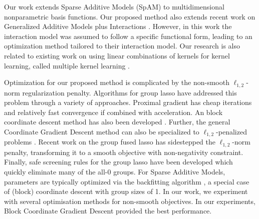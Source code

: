 Our work extends Sparse Additive Models (SpAM) \citep{ravikumar09spam} 
to multidimensional nonparametric basis functions.
Our proposed method also extends recent work on 
Generalized Additive Models plus Interactions \citep{intelligible:2013}.
However, in this work the interaction model was assumed to follow a specific functional form,
leading to an optimization method tailored to their interaction model.
Our research is also related to existing work on 
using linear combinations of kernels for kernel learning,
called multiple kernel learning \citep{mkl-review:2011}.

Optimization for our proposed method is complicated by 
the non-smooth $\ell_{1,2}$-norm regularization penalty.
Algorithms for group lasso have addressed this problem 
through a variety of approaches.
Proximal gradient \citep{beck2009fast}
has cheap iterations and relatively fast convergence if combined with acceleration.
An block coordinate descent method has also been developed \citep{bcd-group-lasso:2013}.
Further, the general Coordinate Gradient Descent method \citep{cgd:2009} 
can also be specialized to $\ell_{1,2}$-penalized problems 
\citep{meier2008group,note-group-lasso:2010}.
Recent work \citep{group-fused-lasso:2014} on the group fused lasso 
has sidestepped the $\ell_{1,2}$-norm penalty, transforming it to a 
smooth objective with non-negativity constraint.
Finally, safe screening rules for the group lasso have been developed 
\citep{group-lasso-screening:2013} which quickly eliminate many of the all-0 
groups.
For Sparse Additive Models, parameters are typically 
optimized via the backfitting algorithm \citep{ravikumar09spam}, 
a special case of (block) coordinate descent with group sizes of 1.
In our work, we experiment with several optimisation methods for non-smooth
objectives. In our experiments, Block Coordinate Gradient Descent provided the
best performance.

